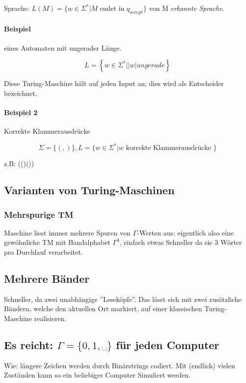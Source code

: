 Sprache: $L(M) = \{w \in \Sigma^\ast | M \text{ endet in } q_{accept} \}$
von M \emph{erkannte Sprache}.

\paragraph{Beispiel} eines Automaten mit ungerader Länge.

\[
	L = \left\{w \in \Sigma^\ast \left| \left|w\right| ungerade \right.\right\}
\]


Diese Turing-Maschine hält auf jeden Input an; dies wird als Entscheider bezeichnet.

\paragraph{Beispiel 2} Korrekte Klammerausdrücke

\[
	\Sigma = \{(,)\}, L = \{w \in \Sigma^\ast | w \text{ korrekte Klammerausdrücke } \}
\]

z.B: (()())


\subsection{Varianten von Turing-Maschinen}

\subsubsection{Mehrspurige TM}

Maschine liest immer mehrere Spuren von $\Gamma$-Werten aus; eigentlich also eine gewöhnliche TM mit Bandalphabet $\Gamma^3$, einfach etwas Schneller da sie 3 Wörter pro Durchlauf verarbeitet.

\subsection{Mehrere Bänder}

Schneller, da zwei unabhängige ''Leseköpfe''. Das lässt sich mit zwei zusätzliche Bändern, welche den aktuellen Ort markiert, auf einer klassischen Turing-Maschine realisieren.

\subsection{Es reicht: $\Gamma = \{ 0, 1, \text{␣}\}$ für jeden Computer}

Wie: längere Zeichen werden durch Binärstrings codiert. Mit (endlich) vielen Zuständen kann so ein beliebiger Computer Simuliert werden.


